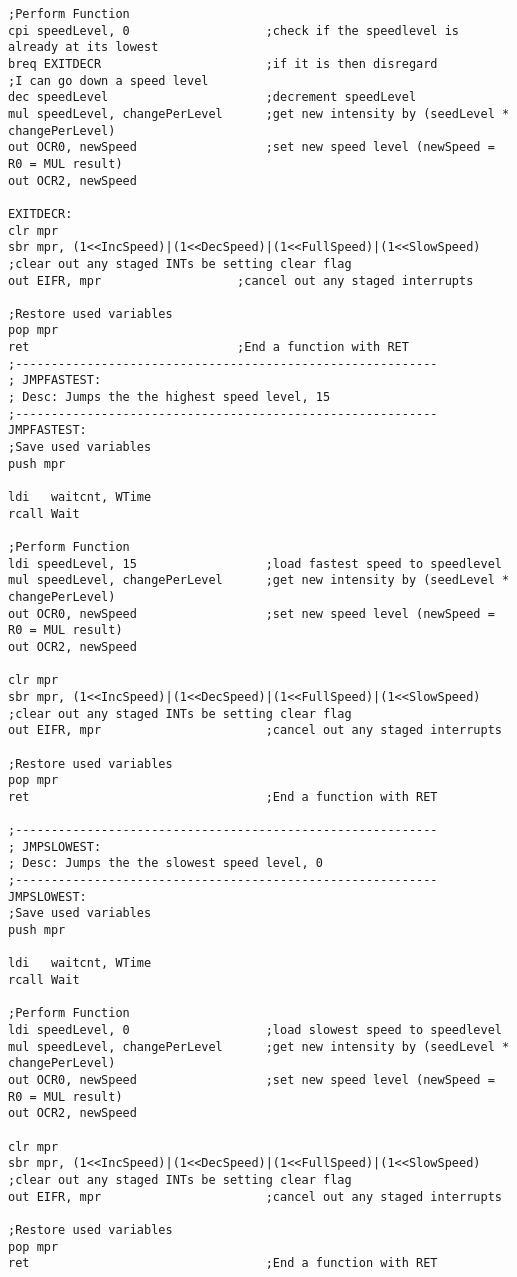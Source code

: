 \documentclass[12pt,letterpaper]{article}
\begin{document}
\begin{verbatim}
;Perform Function
cpi speedLevel, 0					;check if the speedlevel is already at its lowest
breq EXITDECR						;if it is then disregard
;I can go down a speed level
dec speedLevel						;decrement speedLevel	
mul speedLevel, changePerLevel		;get new intensity by (seedLevel * changePerLevel)
out OCR0, newSpeed					;set new speed level (newSpeed = R0 = MUL result)
out OCR2, newSpeed

EXITDECR:
clr mpr
sbr mpr, (1<<IncSpeed)|(1<<DecSpeed)|(1<<FullSpeed)|(1<<SlowSpeed) ;clear out any staged INTs be setting clear flag
out EIFR, mpr					;cancel out any staged interrupts

;Restore used variables
pop mpr
ret								;End a function with RET
;-----------------------------------------------------------
; JMPFASTEST: 
; Desc:	Jumps the the highest speed level, 15
;-----------------------------------------------------------
JMPFASTEST:
;Save used variables
push mpr

ldi   waitcnt, WTime
rcall Wait

;Perform Function
ldi speedLevel, 15					;load fastest speed to speedlevel
mul speedLevel, changePerLevel		;get new intensity by (seedLevel * changePerLevel)
out OCR0, newSpeed					;set new speed level (newSpeed = R0 = MUL result)
out OCR2, newSpeed

clr mpr
sbr mpr, (1<<IncSpeed)|(1<<DecSpeed)|(1<<FullSpeed)|(1<<SlowSpeed) ;clear out any staged INTs be setting clear flag
out EIFR, mpr						;cancel out any staged interrupts

;Restore used variables
pop mpr
ret									;End a function with RET

;-----------------------------------------------------------
; JMPSLOWEST: 
; Desc:	Jumps the the slowest speed level, 0
;-----------------------------------------------------------
JMPSLOWEST:	
;Save used variables
push mpr

ldi   waitcnt, WTime
rcall Wait

;Perform Function
ldi speedLevel, 0					;load slowest speed to speedlevel
mul speedLevel, changePerLevel		;get new intensity by (seedLevel * changePerLevel)
out OCR0, newSpeed					;set new speed level (newSpeed = R0 = MUL result)
out OCR2, newSpeed

clr mpr
sbr mpr, (1<<IncSpeed)|(1<<DecSpeed)|(1<<FullSpeed)|(1<<SlowSpeed) ;clear out any staged INTs be setting clear flag
out EIFR, mpr						;cancel out any staged interrupts

;Restore used variables
pop mpr
ret									;End a function with RET
	\end{verbatim}
\end{document}
